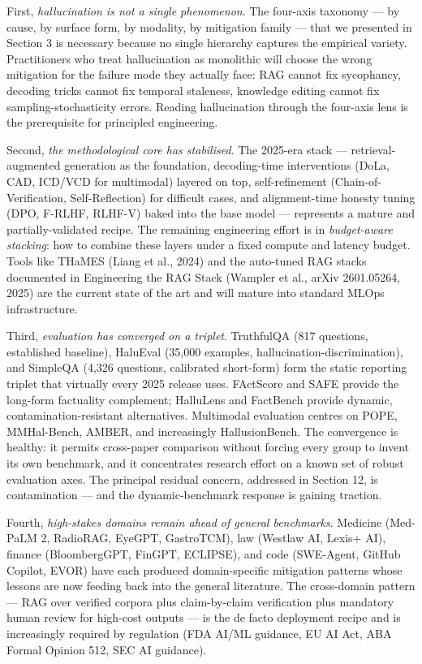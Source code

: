 First, \emph{hallucination is not a single phenomenon}. The four-axis taxonomy --- by cause, by surface form, by modality, by mitigation family --- that we presented in Section 3 is necessary because no single hierarchy captures the empirical variety. Practitioners who treat hallucination as monolithic will choose the wrong mitigation for the failure mode they actually face: RAG cannot fix sycophancy, decoding tricks cannot fix temporal staleness, knowledge editing cannot fix sampling-stochasticity errors. Reading hallucination through the four-axis lens is the prerequisite for principled engineering.

Second, \emph{the methodological core has stabilised}. The 2025-era stack --- retrieval-augmented generation as the foundation, decoding-time interventions (DoLa, CAD, ICD/VCD for multimodal) layered on top, self-refinement (Chain-of-Verification, Self-Reflection) for difficult cases, and alignment-time honesty tuning (DPO, F-RLHF, RLHF-V) baked into the base model --- represents a mature and partially-validated recipe. The remaining engineering effort is in \emph{budget-aware stacking}: how to combine these layers under a fixed compute and latency budget. Tools like THaMES (Liang et al., 2024) and the auto-tuned RAG stacks documented in Engineering the RAG Stack (Wampler et al., arXiv 2601.05264, 2025) are the current state of the art and will mature into standard MLOps infrastructure.

Third, \emph{evaluation has converged on a triplet}. TruthfulQA (817 questions, established baseline), HaluEval (35,000 examples, hallucination-discrimination), and SimpleQA (4,326 questions, calibrated short-form) form the static reporting triplet that virtually every 2025 release uses. FActScore and SAFE provide the long-form factuality complement; HalluLens and FactBench provide dynamic, contamination-resistant alternatives. Multimodal evaluation centres on POPE, MMHal-Bench, AMBER, and increasingly HallusionBench. The convergence is healthy: it permits cross-paper comparison without forcing every group to invent its own benchmark, and it concentrates research effort on a known set of robust evaluation axes. The principal residual concern, addressed in Section 12, is contamination --- and the dynamic-benchmark response is gaining traction.

Fourth, \emph{high-stakes domains remain ahead of general benchmarks}. Medicine (Med-PaLM 2, RadioRAG, EyeGPT, GastroTCM), law (Westlaw AI, Lexis+ AI), finance (BloombergGPT, FinGPT, ECLIPSE), and code (SWE-Agent, GitHub Copilot, EVOR) have each produced domain-specific mitigation patterns whose lessons are now feeding back into the general literature. The cross-domain pattern --- RAG over verified corpora plus claim-by-claim verification plus mandatory human review for high-cost outputs --- is the de facto deployment recipe and is increasingly required by regulation (FDA AI/ML guidance, EU AI Act, ABA Formal Opinion 512, SEC AI guidance).

